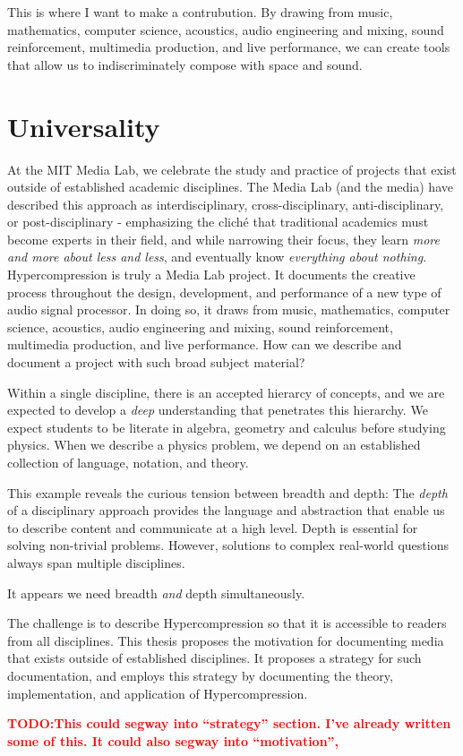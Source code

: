 \documentclass{tufte-book}
\newcommand{\TODO}[1]{\textcolor{red}{\bf TODO:#1}\xspace}
\newcommand{\thesis}{Hypercompression\xspace}
\begin{document}
This is where I want to make a contrubution. By drawing from music,
mathematics, computer science, acoustics, audio engineering and
mixing, sound reinforcement, multimedia production, and live
performance, we can create tools that allow us to indiscriminately
compose with space and sound.

\section{Universality}
\label{sec:universality}

At the MIT Media Lab, we celebrate the study and practice of projects
that exist outside of established academic disciplines. The Media Lab
(and the media) have described this approach as interdisciplinary,
cross-disciplinary, anti-disciplinary, or post-disciplinary -
emphasizing the clich\'{e} that traditional academics must become
experts in their field, and while narrowing their focus, they learn
\textit{more and more about less and less}, and eventually know
\textit{everything about nothing}.  \thesis is truly a Media Lab
project. It documents the creative process throughout the design,
development, and performance of a new type of audio signal
processor. In doing so, it draws from music, mathematics, computer
science, acoustics, audio engineering and mixing, sound reinforcement,
multimedia production, and live performance. How can we describe and
document a project with such broad subject material?  

Within a single
discipline, there is an accepted hierarcy of concepts, and we are
expected to develop a \emph{deep} understanding that penetrates this
hierarchy. We expect students to be literate in algebra, geometry and
calculus before studying physics. When we describe a physics problem,
we depend on an established collection of language, notation, and
theory.

This example reveals the curious tension between breadth and
depth: The \textit{depth} of a disciplinary approach provides the
language and abstraction that enable us to describe content and
communicate at a high level. Depth is essential for solving
non-trivial problems. However, solutions to complex real-world
questions always span multiple disciplines.


It appears we need breadth \emph{and} depth simultaneously. 

The challenge is to describe \thesis so that it is accessible to
readers from all disciplines. This thesis proposes the motivation for
documenting media that exists outside of established disciplines. It
proposes a strategy for such documentation, and employs this strategy
by documenting the theory, implementation, and application of \thesis.


\TODO{This could segway into ``strategy'' section. I've already
  written some of this. It could also segway into ``motivation'', }



\backmatter





\end{document}
